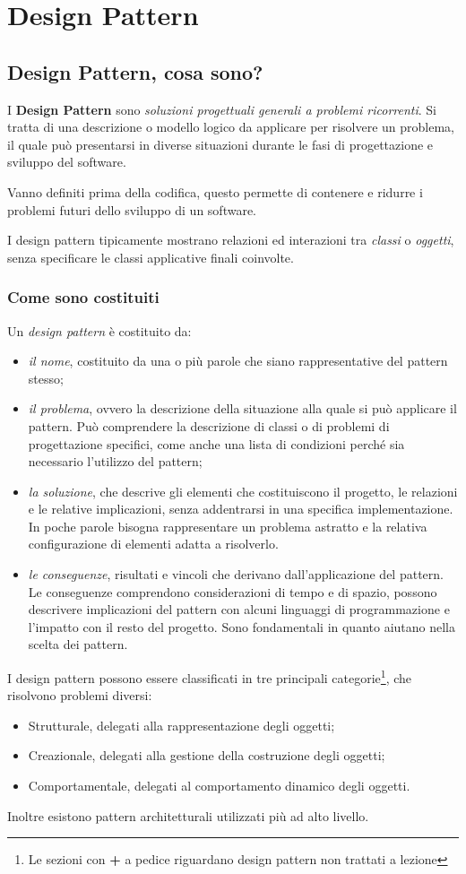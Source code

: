 \chapter{Design Pattern}
\section{Design Pattern, cosa sono?}
I \textbf{Design Pattern} sono \textit{soluzioni progettuali generali a problemi ricorrenti}.
Si tratta di una descrizione o modello logico da applicare per risolvere un problema, il quale può presentarsi in diverse situazioni durante le fasi di progettazione e sviluppo del software.

Vanno definiti prima della codifica, questo permette di contenere e ridurre i problemi futuri dello sviluppo di un software.

I design pattern tipicamente mostrano relazioni ed interazioni tra \textit{classi} o \textit{oggetti}, senza specificare le classi applicative finali coinvolte.

\subsection{Come sono costituiti}
Un \textit{design pattern} è costituito da:
\begin{itemize}
	\item \textit{il nome}, costituito da una o più parole che siano rappresentative del pattern stesso;
	\item \textit{il problema}, ovvero la descrizione della situazione alla quale si può applicare il pattern. Può comprendere la descrizione di classi o di problemi di progettazione specifici, come anche una lista di condizioni perché sia necessario l'utilizzo del pattern;
	\item \textit{la soluzione}, che descrive gli elementi che costituiscono il progetto, le relazioni e le relative implicazioni, senza addentrarsi in una specifica implementazione.
	In poche parole bisogna rappresentare un problema astratto e la relativa configurazione di elementi adatta a risolverlo.
	\item \textit{le conseguenze}, risultati e vincoli che derivano dall'applicazione del pattern. 
	Le conseguenze comprendono considerazioni di tempo e di spazio, possono descrivere implicazioni del pattern con alcuni linguaggi di programmazione e l'impatto con il resto del progetto.
	Sono fondamentali in quanto aiutano nella scelta dei pattern.
\end{itemize}
I design pattern possono essere classificati in tre principali categorie\footnote{Le sezioni con \textbf{+} a pedice riguardano design pattern non trattati a lezione}, che risolvono problemi diversi:
\begin{itemize}
	\item Strutturale, delegati alla rappresentazione degli oggetti;
	\item Creazionale, delegati alla gestione della costruzione degli oggetti;
	\item Comportamentale, delegati al comportamento dinamico degli oggetti.
\end{itemize} 
Inoltre esistono pattern architetturali utilizzati più ad alto livello.

